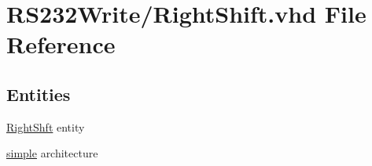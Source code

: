 \hypertarget{_right_shift_8vhd}{}\section{R\+S232\+Write/\+Right\+Shift.vhd File Reference}
\label{_right_shift_8vhd}
\subsection*{Entities}
\begin{DoxyCompactItemize}
\item 
\hyperlink{class_right_shft}{Right\+Shft} entity
\item 
\hyperlink{class_right_shft_1_1simple}{simple} architecture
\end{DoxyCompactItemize}
